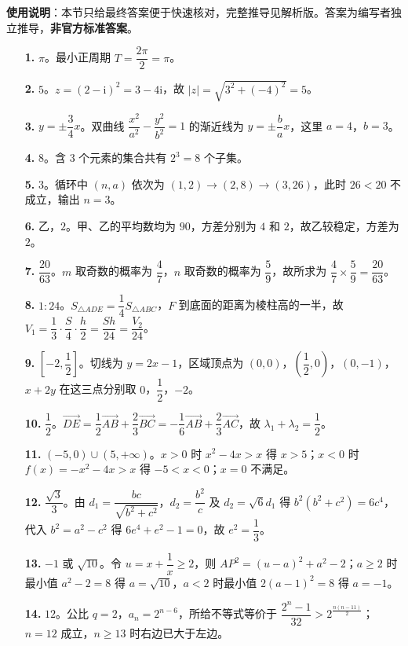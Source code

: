 
\begin{gknotice}
\textbf{使用说明}：本节只给最终答案便于快速核对，完整推导见解析版。答案为编写者独立推导，\textbf{非官方标准答案}。
\end{gknotice}

\begin{itemize}[leftmargin=2.6em]
  \item[\textbf{1.}] $\pi$。最小正周期 $T=\dfrac{2\pi}{2}=\pi$。
  \item[\textbf{2.}] $5$。$z=(2-\mathrm i)^2=3-4\mathrm i$，故 $|z|=\sqrt{3^2+(-4)^2}=5$。
  \item[\textbf{3.}] $y=\pm\dfrac34x$。双曲线 $\dfrac{x^2}{a^2}-\dfrac{y^2}{b^2}=1$ 的渐近线为 $y=\pm\dfrac ba x$，这里 $a=4$，$b=3$。
  \item[\textbf{4.}] $8$。含 $3$ 个元素的集合共有 $2^3=8$ 个子集。
  \item[\textbf{5.}] $3$。循环中 $(n,a)$ 依次为 $(1,2)\to(2,8)\to(3,26)$，此时 $26<20$ 不成立，输出 $n=3$。
  \item[\textbf{6.}] 乙，$2$。甲、乙的平均数均为 $90$，方差分别为 $4$ 和 $2$，故乙较稳定，方差为 $2$。
  \item[\textbf{7.}] $\dfrac{20}{63}$。$m$ 取奇数的概率为 $\dfrac47$，$n$ 取奇数的概率为 $\dfrac59$，故所求为 $\dfrac47\times\dfrac59=\dfrac{20}{63}$。
  \item[\textbf{8.}] $1:24$。$S_{\triangle ADE}=\dfrac14S_{\triangle ABC}$，$F$ 到底面的距离为棱柱高的一半，故 $V_1=\dfrac13\cdot\dfrac S4\cdot\dfrac h2=\dfrac{Sh}{24}=\dfrac{V_2}{24}$。
  \item[\textbf{9.}] $\left[-2,\dfrac12\right]$。切线为 $y=2x-1$，区域顶点为 $(0,0)$，$\left(\dfrac12,0\right)$，$(0,-1)$，$x+2y$ 在这三点分别取 $0$，$\dfrac12$，$-2$。
  \item[\textbf{10.}] $\dfrac12$。$\overrightarrow{DE}=\dfrac12\overrightarrow{AB}+\dfrac23\overrightarrow{BC}=-\dfrac16\overrightarrow{AB}+\dfrac23\overrightarrow{AC}$，故 $\lambda_1+\lambda_2=\dfrac12$。
  \item[\textbf{11.}] $(-5,0)\cup(5,+\infty)$。$x>0$ 时 $x^2-4x>x$ 得 $x>5$；$x<0$ 时 $f(x)=-x^2-4x>x$ 得 $-5<x<0$；$x=0$ 不满足。
  \item[\textbf{12.}] $\dfrac{\sqrt3}{3}$。由 $d_1=\dfrac{bc}{\sqrt{b^2+c^2}}$，$d_2=\dfrac{b^2}{c}$ 及 $d_2=\sqrt6d_1$ 得 $b^2(b^2+c^2)=6c^4$，代入 $b^2=a^2-c^2$ 得 $6e^4+e^2-1=0$，故 $e^2=\dfrac13$。
  \item[\textbf{13.}] $-1$ 或 $\sqrt{10}$。令 $u=x+\dfrac1x\geqslant2$，则 $AP^2=(u-a)^2+a^2-2$；$a\geqslant2$ 时最小值 $a^2-2=8$ 得 $a=\sqrt{10}$，$a<2$ 时最小值 $2(a-1)^2=8$ 得 $a=-1$。
  \item[\textbf{14.}] $12$。公比 $q=2$，$a_n=2^{n-6}$，所给不等式等价于 $\dfrac{2^n-1}{32}>2^{\frac{n(n-11)}2}$；$n=12$ 成立，$n\geqslant13$ 时右边已大于左边。
\end{itemize}

